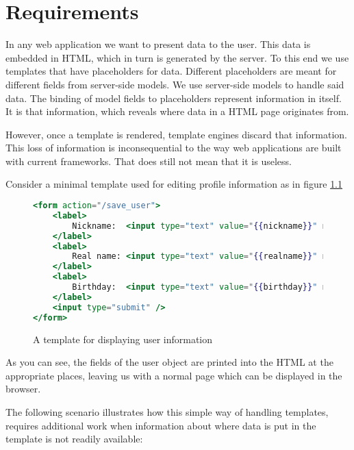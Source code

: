 \documentclass[thesis.tex]{subfiles}
\begin{document}
\chapter{Requirements}
\label{chap:requirements}
In any web application we want to present data to the user.
This data is embedded in HTML, which in turn is generated by the server.
To this end we use templates that have placeholders for data.
Different placeholders are meant for different fields from server-side models.
We use server-side models to handle said data.
The binding of model fields to placeholders represent information in
itself. It is that information, which reveals where data in a HTML page
originates from.

However, once a template is rendered, template engines discard that information.
This loss of information is inconsequential to the way web applications are
built with current frameworks. That does still not mean that it is useless.

Consider a minimal template used for editing profile information as in
figure \ref{fig:user.mustache}
\begin{figure}
	\centering
	\begin{lstlisting}[language=mustache]
<form action="/save_user">
	<label>
		Nickname:  <input type="text" value="{{nickname}}" name="nickname" />
	</label>
	<label>
		Real name: <input type="text" value="{{realname}}" name="realname" />
	</label>
	<label>
		Birthday:  <input type="text" value="{{birthday}}" name="birthday" />
	</label>
	<input type="submit" />
</form>
	\end{lstlisting}
	\caption{A template for displaying user information}
	\label{fig:user.mustache}
\end{figure}

As you can see, the fields of the user object are printed into the HTML
at the appropriate places, leaving us with a normal page which can be
displayed in the browser.

The following scenario illustrates how this simple way of handling templates,
requires additional work when information about where data is put in the
template is not readily available:
\end{document}

